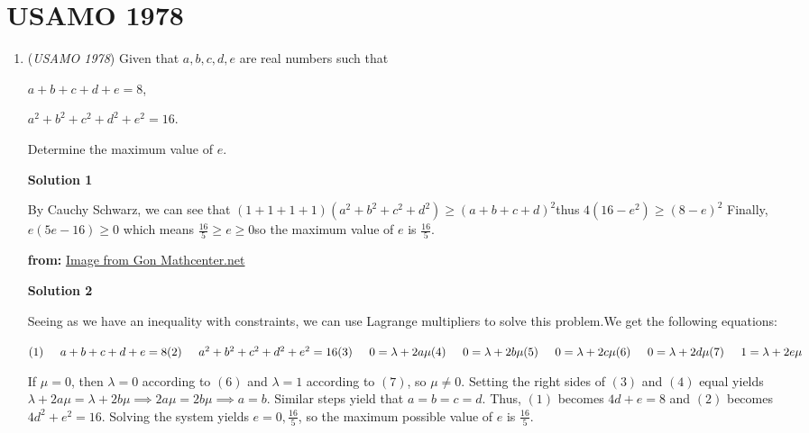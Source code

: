 \section{USAMO 1978}
        \begin{enumerate}
        	\item (\textit{USAMO 1978}) Given that $a,b,c,d,e$ are real numbers such that


 $a+b+c+d+e=8$,


 $a^2+b^2+c^2+d^2+e^2=16$.


 Determine the maximum value of $e$.


 



\textbf{Solution 1}

By Cauchy Schwarz, we can see that $(1+1+1+1)(a^2+b^2+c^2+d^2)\geq (a+b+c+d)^2$thus $4(16-e^2)\geq (8-e)^2$ Finally, $e(5e-16) \geq 0$ which means $\frac{16}{5} \geq e \geq 0$so the maximum value of $e$ is $\frac{16}{5}$.

 \textbf{from:} \href{https://artofproblemsolving.comhttp://image.ohozaa.com/view2/vUGiXdRQdAPyw036}{Image from Gon Mathcenter.net}

 



\textbf{Solution 2}

Seeing as we have an inequality with constraints, we can use Lagrange multipliers to solve this problem.We get the following equations:

 $(1)\hspace*{0.5cm} a+b+c+d+e=8\\ (2)\hspace*{0.5cm} a^{2}+b^{2}+c^{2}+d^{2}+e^{2}=16\\ (3)\hspace*{0.5cm} 0=\lambda+2a\mu\\ (4)\hspace*{0.5cm} 0=\lambda+2b\mu\\ (5)\hspace*{0.5cm} 0=\lambda+2c\mu\\ (6)\hspace*{0.5cm} 0=\lambda+2d\mu\\ (7)\hspace*{0.5cm} 1=\lambda+2e\mu$

 If $\mu=0$, then $\lambda=0$ according to $(6)$ and $\lambda=1$ according to $(7)$, so $\mu \neq 0$. Setting the right sides of $(3)$ and $(4)$ equal yields $\lambda+2a \mu= \lambda+2b \mu \implies 2a\mu=2b \mu \implies a=b$. Similar steps yield that $a=b=c=d$. Thus, $(1)$ becomes $4d+e=8$ and $(2)$ becomes $4d^{2}+e^{2}=16$. Solving the system yields $e=0,\frac{16}{5}$, so the maximum possible value of $e$ is $\frac{16}{5}$.


\end{enumerate}
